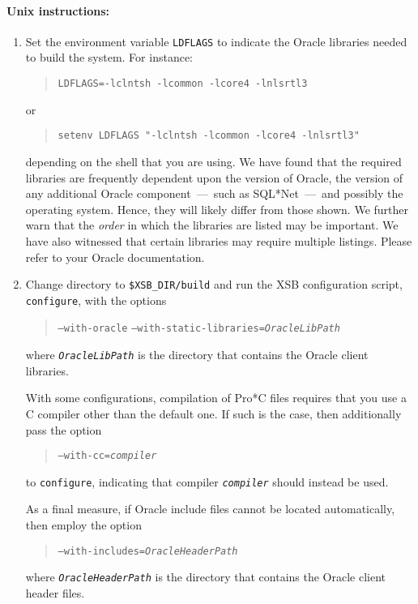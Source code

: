 \paragraph{Unix instructions:}
\begin{enumerate}
\item Set the environment variable {\tt LDFLAGS} to indicate the
Oracle libraries needed to build the system.  For instance:
\begin{quote}
	\texttt{LDFLAGS=-lclntsh -lcommon -lcore4 -lnlsrtl3}
\end{quote}
or
\begin{quote}
	\texttt{setenv LDFLAGS "-lclntsh -lcommon -lcore4 -lnlsrtl3"}
\end{quote}
depending on the shell that you are using.  We have found that the
required libraries are frequently dependent upon the version of
Oracle, the version of any additional Oracle component~---~such as
SQL*Net~---~and possibly the operating system.  Hence, they will
likely differ from those shown.  We further warn that the \emph{order}
in which the libraries are listed may be important.  We have also
witnessed that certain libraries may require multiple listings.
Please refer to your Oracle documentation.

\item Change directory to \texttt{\$XSB\_DIR/build} and run the XSB
configuration script, {\tt configure}, with the options
\begin{quote}
	{\tt --with-oracle}\quad
	{\tt --with-static-libraries=\emph{OracleLibPath}}
\end{quote}
where \texttt{\emph{OracleLibPath}} is the directory that contains
the Oracle client libraries.

With some configurations, compilation of Pro*C files requires that you
use a C compiler other than the default one.  If such is the case,
then additionally pass the option
\begin{quote}
	{\tt --with-cc=\emph{compiler}}
\end{quote}
to \texttt{configure}, indicating that compiler
\emph{\texttt{compiler}} should instead be used.

As a final measure, if Oracle include files cannot be located
automatically, then employ the option
\begin{quote}
	{\tt --with-includes=\emph{OracleHeaderPath}}
\end{quote}
where \texttt{\emph{OracleHeaderPath}} is the directory that contains
the Oracle client header files.


\end{enumerate}
